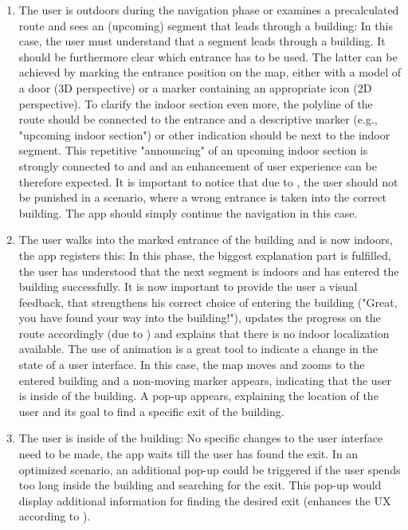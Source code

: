 \begin{enumerate}
    \item The user is outdoors during the navigation phase or examines a precalculated route and sees an (upcoming) segment that leads through a building: In this case, the user must understand that a segment leads through a building. It should be furthermore clear which entrance has to be used. The latter can be achieved by marking the entrance position on the map, either with a model of a door (3D perspective) \cite{jakobs_law} or a marker containing an appropriate icon (2D perspective). To clarify the indoor section even more, the polyline of the route should be connected to the entrance and a descriptive marker (e.g., "upcoming indoor section") or other indication should be next to the indoor segment. This repetitive "announcing" of an upcoming indoor section is strongly connected to \cite{teslers_law} and \cite{law_of_proximity} and an enhancement of user experience can be therefore expected. It is important to notice that due to \cite{postels_law}, the user should not be punished in a scenario, where a wrong entrance is taken into the correct building. The app should simply continue the navigation in this case.
    \item The user walks into the marked entrance of the building and is now indoors, the app registers this: In this phase, the biggest explanation part is fulfilled, the user has understood that the next segment is indoors and has entered the building successfully. It is now important to provide the user a visual feedback, that strengthens his correct choice of entering the building ("Great, you have found your way into the building!"), updates the progress on the route accordingly (due to \cite{goal_gradient_effect}) and explains that there is no indoor localization available. The use of animation is a great tool to indicate a change in the state of a user interface. In this case, the map moves and zooms to the entered building and a non-moving marker appears, indicating that the user is inside of the building. A pop-up appears, explaining the location of the user and its goal to find a specific exit of the building.
    \item The user is inside of the building: No specific changes to the user interface need to be made, the app waits till the user has found the exit. In an optimized scenario, an additional pop-up could be triggered if the user spends too long inside the building and searching for the exit. This pop-up would display additional information for finding the desired exit (enhances the UX according to \cite{teslers_law}).

\end{enumerate}

